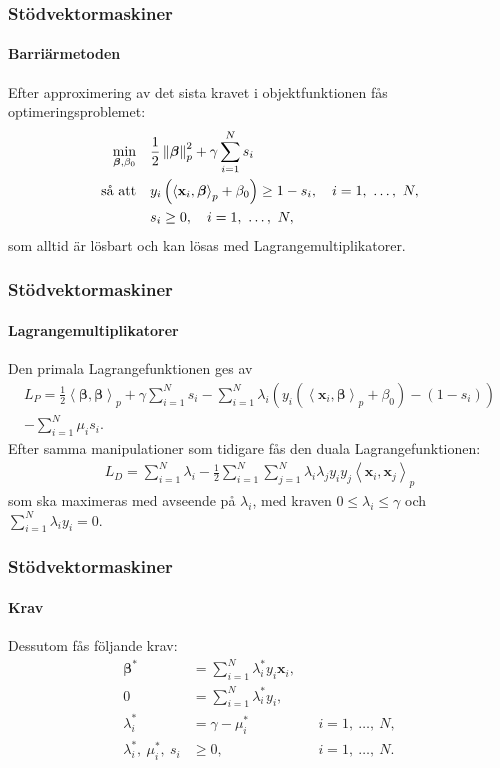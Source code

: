 \documentclass{beamer}
\theoremstyle{definition}
\theoremstyle{remark}
\newcommand{\bfbeta}{{\boldsymbol{\beta}}}
\newcommand{\bfx}{\mathbf{x}}
\newcommand{\llangle}{\left\langle}
\newcommand{\rrangle}{\right\rangle}
\newcommand{\inner}[2]{\llangle #1, #2 \rrangle}
\begin{document}
\begin{frame}
\frametitle{Stödvektormaskiner}
\framesubtitle{Barriärmetoden}
Efter approximering av det sista kravet i objektfunktionen fås optimeringsproblemet:
\begin{equation*}\label{eq:softpenalty1}
\begin{aligned}
\operatornamewithlimits{min}_{\bfbeta, \beta_0} & & &\frac{1}{2}\left\|\bfbeta
\right\|_p^2 + \gamma\sum_{i=1}^{N} s_i\\
\text{så att} & & &y_i\left(\inner{\bfx_i}{\bfbeta}_p+\beta_0\right)\geq 1 - s_i,\quad i=1,~\dots,~N,\\
& & &s_i\geq0,\quad i=1,~\dots,~N,
\end{aligned}
\end{equation*}
som alltid är lösbart och kan lösas med Lagrangemultiplikatorer.
\end{frame}

\begin{frame}
\frametitle{Stödvektormaskiner}
\framesubtitle{Lagrangemultiplikatorer}
Den primala Lagrangefunktionen ges av
\begin{gather*}
L_P = \frac{1}{2}\inner{\bfbeta}{\bfbeta}_p+\gamma\sum_{i=1}^{N}s_i - \sum_{i=1}^{N}\lambda_i\left(y_i\left(\inner{\bfx_i}{\bfbeta}_p + \beta_0\right)-\left(1-s_i\right)\right)\\-\sum_{i=1}^{N}\mu_is_i.
\end{gather*}
Efter samma manipulationer som tidigare fås den duala Lagrangefunktionen:
\begin{gather*}
L_D = \sum_{i=1}^{N}\lambda_i - \frac{1}{2}\sum_{i=1}^{N}\sum_{j=1}^{N}\lambda_i\lambda_jy_iy_j\inner{\bfx_i}{\bfx_j}_p
\end{gather*}
som ska maximeras med avseende på $\lambda_i$, med kraven $0\leq\lambda_i\leq\gamma$ och $\sum_{i=1}^{N}\lambda_iy_i=0$.
\end{frame}

\begin{frame}
\frametitle{Stödvektormaskiner}
\framesubtitle{Krav}
Dessutom fås följande krav:
\begin{align}
\label{eq:softkrav1}	\bfbeta^* &= \sum_{i=1}^{N} \lambda_i^*y_i\mathbf{x}_i, & &\\
\label{eq:softkrav2}	0 &= \sum_{i=1}^{N} \lambda^*_iy_i, & &\\
\label{eq:softkrav3}	\lambda^*_i &= \gamma - \mu^*_i \quad& &i = 1,~\dots,~N,\\
\label{eq:softkrav4}	\lambda^*_i,~\mu^*_i,~s_i&\geq0,\quad& &i = 1,~\dots,~N.
\end{align}
\end{frame}
\end{document}
